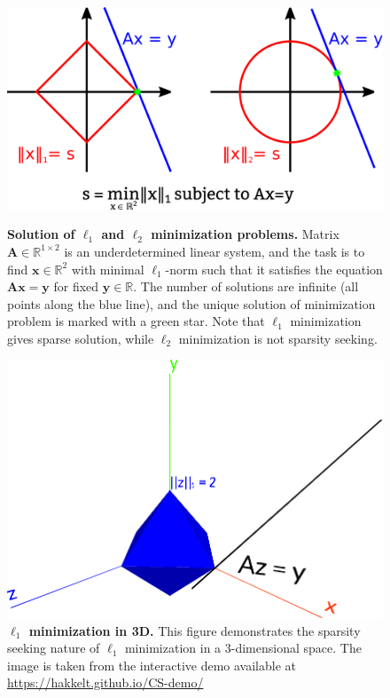 \begin{figure}[tb]
    \centering
    \begin{minipage}{.63\textwidth}
        \centering
        \includegraphics[width=0.7\linewidth]{images/sparse_solution.pdf}
        \caption{\textbf{Solution of $\ell_1$ and $\ell_2$ minimization problems.} Matrix $\mathbf{A} \in \mathbb{R}^{1 \times 2}$ is an underdetermined linear system, and the task is to find $\mathbf{x} \in \mathbb{R}^2$ with minimal $\ell_1$-norm such that it satisfies the equation $\mathbf{Ax} = \mathbf{y}$ for fixed $\mathbf{y} \in \mathbb{R}$. The number of solutions are infinite (all points along the blue line), and the unique solution of minimization problem is marked with a green star. Note that $\ell_1$ minimization gives sparse solution, while $\ell_2$ minimization is not sparsity seeking.}
        \label{fig:sparse_solution}
    \end{minipage}%
    \hspace{0.02\textwidth}
    \begin{minipage}{0.34\textwidth}
        \centering
        \includegraphics[width=\linewidth]{images/3D_l1_min.pdf}
        \caption{\textbf{$\ell_1$ minimization in 3D.} This figure demonstrates the sparsity seeking nature of $\ell_1$ minimization in a 3-dimensional space. The image is taken from the interactive demo available at \url{https://hakkelt.github.io/CS-demo/}}
        \label{fig:3D_l1_min}
    \end{minipage}
\end{figure}

